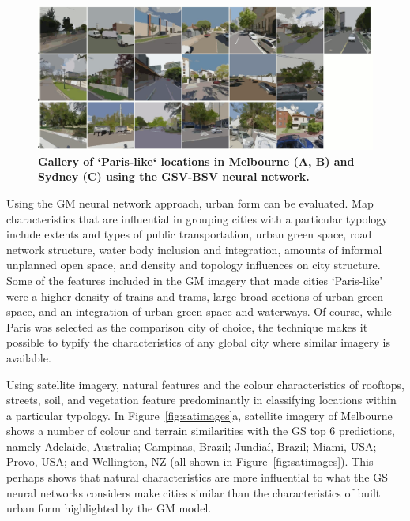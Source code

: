 \documentclass[urbansci,article,submit,moreauthors,pdftex]{Definitions/mdpi}
\begin{document}
\begin{figure}[!htbp]
\centering    
\includegraphics[scale=0.20]{Figure9MelSydStreet_2.png}  
\caption{\bf Gallery of `Paris-like` locations in Melbourne (A, B) and Sydney (C) using the GSV-BSV neural network.}    
 \label{fig:gsv_mel_gallery}  
\end{figure} 


Using the GM neural network approach, urban form can be evaluated. Map characteristics that are influential in grouping cities with a particular typology include extents and types of public transportation, urban green space, road network structure, water body inclusion and integration, amounts of informal unplanned open space, and density and topology influences on city structure. Some of the features included in the GM imagery that made cities `Paris-like' were a higher density of trains and trams, large broad sections of urban green space, and an integration of urban green space and waterways. Of course, while Paris was selected as the comparison city of choice, the technique makes it possible to typify the characteristics of any global city where similar imagery is available.

Using satellite imagery, natural features and the colour characteristics of rooftops, streets, soil, and vegetation feature predominantly in classifying locations within a particular typology. In Figure~\ref{fig:satimages}a, satellite imagery of Melbourne shows a number of colour and terrain similarities with the GS top 6 predictions, namely Adelaide, Australia; Campinas, Brazil; Jundia\'{i}, Brazil; Miami, USA; Provo, USA; and Wellington, NZ (all shown in Figure~\ref{fig:satimages}). This perhaps shows that natural characteristics are more influential to what the GS neural networks considers make cities similar than the characteristics of built urban form highlighted by the GM model.
\end{document}

